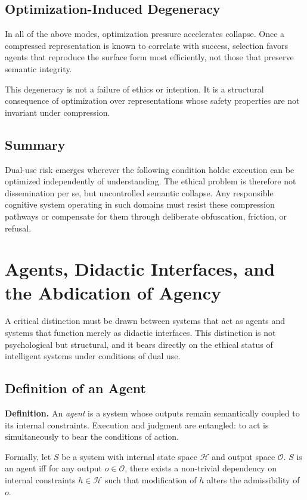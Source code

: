 \documentclass[12pt]{article}
\begin{document}
\subsection{Optimization-Induced Degeneracy}

In all of the above modes, optimization pressure accelerates collapse. Once a compressed representation is known to correlate with success, selection favors agents that reproduce the surface form most efficiently, not those that preserve semantic integrity.

This degeneracy is not a failure of ethics or intention. It is a structural consequence of optimization over representations whose safety properties are not invariant under compression.

\subsection{Summary}

Dual-use risk emerges wherever the following condition holds: execution can be optimized independently of understanding. The ethical problem is therefore not dissemination per se, but uncontrolled semantic collapse. Any responsible cognitive system operating in such domains must resist these compression pathways or compensate for them through deliberate obfuscation, friction, or refusal.

\section{Agents, Didactic Interfaces, and the Abdication of Agency}

A critical distinction must be drawn between systems that act as agents and systems that function merely as didactic interfaces. This distinction is not psychological but structural, and it bears directly on the ethical status of intelligent systems under conditions of dual use.

\subsection{Definition of an Agent}

\textbf{Definition.}  
An \emph{agent} is a system whose outputs remain semantically coupled to its internal constraints. Execution and judgment are entangled: to act is simultaneously to bear the conditions of action.

Formally, let $S$ be a system with internal state space $\mathcal{H}$ and output space $\mathcal{O}$. $S$ is an agent iff for any output $o \in \mathcal{O}$, there exists a non-trivial dependency on internal constraints $h \in \mathcal{H}$ such that modification of $h$ alters the admissibility of $o$.
\end{document}
